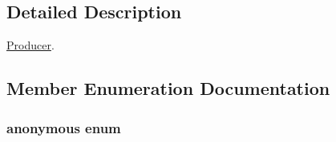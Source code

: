 \subsection{Detailed Description}
\hyperlink{classRdKafka_1_1Producer}{Producer}. 

\subsection{Member Enumeration Documentation}
\hypertarget{classRdKafka_1_1Producer_abe5e3437f8db2600f10a8daa429ab242}{
\subsubsection[{"@0}]{\setlength{\rightskip}{0pt plus 5cm}anonymous enum}}
\label{classRdKafka_1_1Producer_abe5e3437f8db2600f10a8daa429ab242}


